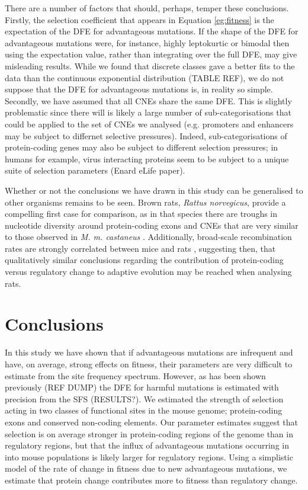 \documentclass[11pt]{article}
\begin{document}
	



	There are a number of factors that should, perhaps, temper these conclusions. Firstly, the selection coefficient that appears in Equation \ref{eg:fitness} is the expectation of the DFE for advantageous mutations. If the shape of the DFE for advantageous mutations were, for instance, highly leptokurtic or bimodal then using the expectation value, rather than integrating over the full DFE, may give misleading results. While we found that discrete classes gave a better fits to the data than the continuous exponential distribution (TABLE REF), we do not suppose that the DFE for advantageous mutations is, in reality so simple. Secondly, we have assumed that all CNEs share the same DFE. This is slightly problematic since there will is likely a large number of sub-categorisations that could be applied to the set of CNEs we analysed (e.g. promoters and enhancers may be subject to differnet selective pressures). Indeed, sub-categorisations of protein-coding genes may also be subject to different selection pressures; in humans for example, virus interacting proteins seem to be subject to a unique suite of selection parameters (Enard eLife paper). 


Whether or not the conclusions we have drawn in this study can be generalised to other organisms  remains to be seen. Brown rats, \textit{Rattus norvegicus}, provide a compelling first case for comparison, as in that species there are troughs in nucleotide diversity around protein-coding exons and CNEs that are very similar to those observed in \textit{M. m. castaneus} \citep{RN327}. Additionally, broad-scale recombination rates are strongly correlated between mice and rats \citep{RN184}, suggesting then, that qualitatively similar conclusions regarding the contribution of protein-coding versus regulatory change to adaptive evolution may be reached when analysing rats. 

\section*{Conclusions}

In this study we have shown that if advantageous mutations are infrequent and have, on average, strong effects on fitness, their parameters are very difficult to estimate from the site frequency spectrum. However, as has been shown previously (REF DUMP) the DFE for harmful mutations is estimated with precision from the SFS (RESULTS?). We estimated the strength of selection acting in two classes of functional sites in the mouse genome; protein-coding exons and conserved non-coding elements. Our parameter estimates suggest that selection is on average stronger in protein-coding regions of the genome than in regulatory regions, but that the influx of advantageous mutations occurring in into mouse populations is likely larger for regulatory regions. Using a simplistic model of the rate of change in fitness due to new advantageous mutations, we estimate that protein change contributes more to fitness than regulatory change.
\end{document}
